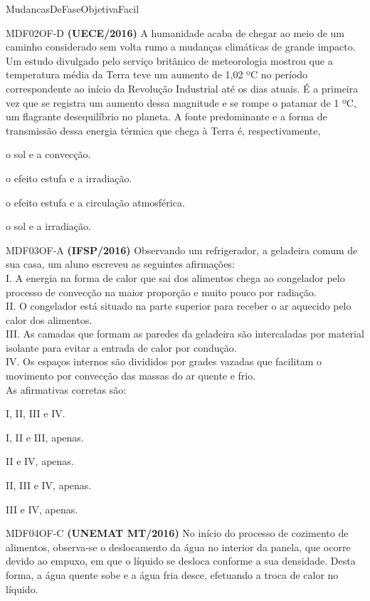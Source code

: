\documentclass[12pt]{article}
\begin{document}
\begin{quiz}{MudancasDeFaseObjetivaFacil}
		\begin{multi}[points=1]{MDF02OF-D}
			\textbf{(UECE/2016)} A humanidade acaba de chegar ao meio de um caminho considerado sem volta rumo a mudanças climáticas de grande impacto. Um estudo divulgado pelo serviço britânico de meteorologia mostrou que a temperatura média da Terra teve um aumento de 1,02 ºC no período correspondente ao início da Revolução Industrial até os dias atuais. É a primeira vez que se registra um aumento dessa magnitude e se rompe o patamar de 1 ºC, um flagrante desequilíbrio no planeta. A fonte predominante e a forma de transmissão dessa energia térmica que chega à Terra é, respectivamente,					
			\item o sol e a convecção.
			\item o efeito estufa e a irradiação.
			\item o efeito estufa e a circulação atmosférica.
			\item* o sol e a irradiação.
		\end{multi}
		\begin{multi}[points=1]{MDF03OF-A}
			\textbf{(IFSP/2016)} Observando um refrigerador, a geladeira comum de sua casa, um aluno escreveu as seguintes afirmações:\\			
			I.	A energia na forma de calor que sai dos alimentos chega ao congelador pelo processo de convecção na maior proporção e muito pouco por radiação.\\
			II.	O congelador está situado na parte superior para receber o ar aquecido pelo calor dos alimentos.\\
			III. As camadas que formam as paredes da geladeira são intercaladas por material isolante para evitar a entrada de calor por condução.\\
			IV.	Os espaços internos são divididos por grades vazadas que facilitam o movimento por convecção das massas do ar quente e frio.\\			
			As afirmativas corretas são:							
			\item* I, II, III e IV.
			\item I, II e III, apenas.
			\item II e IV, apenas.
			\item II, III e IV, apenas.
			\item III e IV, apenas.
		\end{multi}
		\begin{multi}[points=1]{MDF04OF-C}
			\textbf{(UNEMAT MT/2016)} No início do processo de cozimento de alimentos, observa-se o deslocamento da água no interior da panela, que ocorre devido ao empuxo, em que o líquido se desloca conforme a sua densidade. Desta forma, a água quente sobe e a água fria desce, efetuando a troca de calor no líquido.\\			

\end{multi}
\end{quiz}
\end{document}
